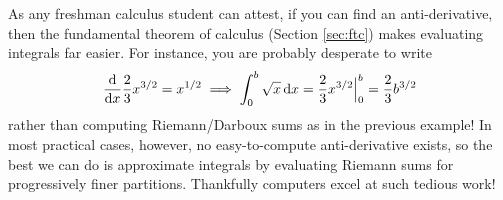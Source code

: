 % 

As any freshman calculus student can attest, if you can find an anti-derivative, then the fundamental theorem of calculus (Section \ref{sec:ftc}) makes evaluating integrals far easier. For instance, you are probably desperate to write
\[\frac{\mathrm{d} }{\mathrm{d} x}\frac 23x^{3/2}=x^{1/2}\implies\int_0^b\sqrt x\,{\mathrm{d} x}=\frac 23x^{3/2}\Big|_0^b=\frac 23b^{3/2}\]
rather than computing Riemann/Darboux sums as in the previous example! In most practical cases, however, no easy-to-compute anti-derivative exists, so the best we can do is approximate integrals by evaluating Riemann sums for progressively finer partitions. Thankfully computers excel at such tedious work!

